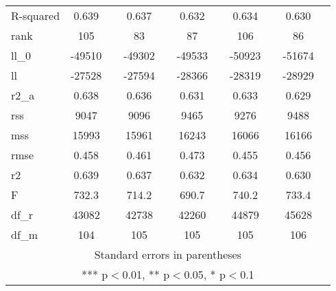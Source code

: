\documentclass[]{article}
\begin{document}
\begin{tabular}{lcccccccccc}
R-squared & 0.639 &  & 0.637 &  & 0.632 &  & 0.634 &  & 0.630 &  \\
rank & 105 &  & 83 &  & 87 &  & 106 &  & 86 &  \\
ll\_0 & -49510 &  & -49302 &  & -49533 &  & -50923 &  & -51674 &  \\
ll & -27528 &  & -27594 &  & -28366 &  & -28319 &  & -28929 &  \\
r2\_a & 0.638 &  & 0.636 &  & 0.631 &  & 0.633 &  & 0.629 &  \\
rss & 9047 &  & 9096 &  & 9465 &  & 9276 &  & 9488 &  \\
mss & 15993 &  & 15961 &  & 16243 &  & 16066 &  & 16166 &  \\
rmse & 0.458 &  & 0.461 &  & 0.473 &  & 0.455 &  & 0.456 &  \\
r2 & 0.639 &  & 0.637 &  & 0.632 &  & 0.634 &  & 0.630 &  \\
F & 732.3 &  & 714.2 &  & 690.7 &  & 740.2 &  & 733.4 &  \\
df\_r & 43082 &  & 42738 &  & 42260 &  & 44879 &  & 45628 &  \\
 df\_m & 104 &  & 105 &  & 105 &  & 105 &  & 106 &  \\ \hline
\multicolumn{11}{c}{ Standard errors in parentheses} \\
\multicolumn{11}{c}{ *** p$<$0.01, ** p$<$0.05, * p$<$0.1} \\
\end{tabular}
\end{document}
